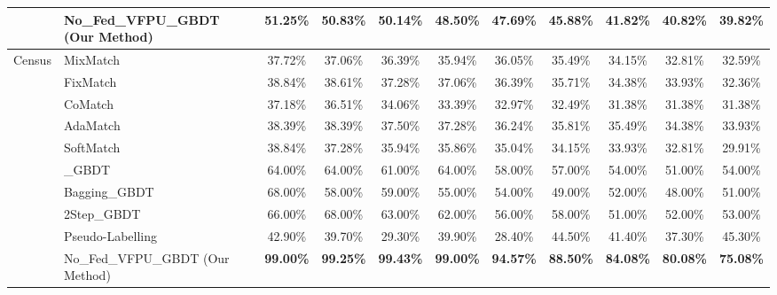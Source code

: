 \begin{table}[h]
{{\begin{tabular}{llccccccccc}
				& No\_Fed\_VFPU\_GBDT (Our Method) & \textbf{51.25\%} & \textbf{50.83\%} & \textbf{50.14\%} & \textbf{48.50\%} & \textbf{47.69\%} & \textbf{45.88\%} & \textbf{41.82\%} & \textbf{40.82\%} & \textbf{39.82\%}  \\ 
				\hline
				\multirow{10}{*}{Census} & MixMatch                         & 37.72\%          & 37.06\%          & 36.39\%          & 35.94\%          & 36.05\%          & 35.49\%          & 34.15\%          & 32.81\%          & 32.59\%           \\
				& FixMatch                         & 38.84\%          & 38.61\%          & 37.28\%          & 37.06\%          & 36.39\%          & 35.71\%          & 34.38\%          & 33.93\%          & 32.36\%           \\
				& CoMatch                          & 37.18\%          & 36.51\%          & 34.06\%          & 33.39\%          & 32.97\%          & 32.49\%          & 31.38\%          & 31.38\%          & 31.38\%           \\
				& AdaMatch                         & 38.39\%          & 38.39\%          & 37.50\%          & 37.28\%          & 36.24\%          & 35.81\%          & 35.49\%          & 34.38\%          & 33.93\%           \\
				& SoftMatch                        & 38.84\%          & 37.28\%          & 35.94\%          & 35.86\%          & 35.04\%          & 34.15\%          & 33.93\%          & 32.81\%          & 29.91\%           \\
				& \_GBDT                           & 64.00\%          & 64.00\%          & 61.00\%          & 64.00\%          & 58.00\%          & 57.00\%          & 54.00\%          & 51.00\%          & 54.00\%           \\
				& Bagging\_GBDT                    & 68.00\%          & 58.00\%          & 59.00\%          & 55.00\%          & 54.00\%          & 49.00\%          & 52.00\%          & 48.00\%          & 51.00\%           \\
				& 2Step\_GBDT                      & 66.00\%          & 68.00\%          & 63.00\%          & 62.00\%          & 56.00\%          & 58.00\%          & 51.00\%          & 52.00\%          & 53.00\%           \\
				& Pseudo-Labelling                 & 42.90\%          & 39.70\%          & 29.30\%          & 39.90\%          & 28.40\%          & 44.50\%          & 41.40\%          & 37.30\%          & 45.30\%           \\
				& No\_Fed\_VFPU\_GBDT (Our Method) & \textbf{99.00\%} & \textbf{99.25\%} & \textbf{99.43\%} & \textbf{99.00\%} & \textbf{94.57\%} & \textbf{88.50\%} & \textbf{84.08\%} & \textbf{80.08\%} & \textbf{75.08\%}  \\
				\hline
			\end{tabular}
		}
	}
\end{table}
\vspace{-0.1cm}

